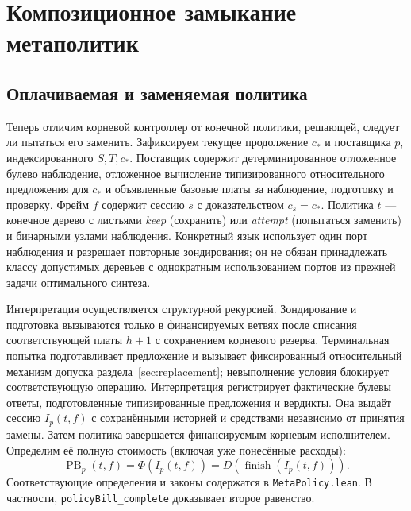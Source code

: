 \documentclass[10pt,a4paper]{article}
\newcommand{\PB}{\operatorname{PB}}
\newcommand{\finish}{\operatorname{finish}}
\newcommand{\rc}[1]{\allowbreak\texttt{#1}\allowbreak}
\begin{document}
\section{Композиционное замыкание метаполитик}\label{sec:closure}
\subsection{Оплачиваемая и заменяемая политика}
Теперь отличим корневой контроллер от конечной политики, решающей, следует ли пытаться его заменить. Зафиксируем текущее продолжение $c_*$ и поставщика $p$, индексированного $S,T,c_*$. Поставщик содержит детерминированное отложенное булево наблюдение, отложенное вычисление типизированного относительного предложения для $c_*$ и объявленные базовые платы за наблюдение, подготовку и проверку. Фрейм $f$ содержит сессию $s$ с доказательством $c_s=c_*$. Политика $t$ --- конечное дерево с листьями \emph{keep} (сохранить) или \emph{attempt} (попытаться заменить) и бинарными узлами наблюдения. Конкретный язык использует один порт наблюдения и разрешает повторные зондирования; он не обязан принадлежать классу допустимых деревьев с однократным использованием портов из прежней задачи оптимального синтеза.

Интерпретация осуществляется структурной рекурсией. Зондирование и подготовка вызываются только в финансируемых ветвях после списания соответствующей платы $h+1$ с сохранением корневого резерва. Терминальная попытка подготавливает предложение и вызывает фиксированный относительный механизм допуска раздела~\ref{sec:replacement}; невыполнение условия блокирует соответствующую операцию. Интерпретация регистрирует фактические булевы ответы, подготовленные типизированные предложения и вердикты. Она выдаёт сессию $I_p(t,f)$ с сохранёнными историей и средствами независимо от принятия замены. Затем политика завершается финансируемым корневым исполнителем. Определим её полную стоимость (включая уже понесённые расходы):
\begin{equation}\label{eq:policy-bill}
 \PB_p(t,f)=\Phi(I_p(t,f))=D(\finish(I_p(t,f))).
\end{equation}
Соответствующие определения и законы содержатся в \rc{MetaPolicy.lean}. В частности, \rc{policyBill\_complete} доказывает второе равенство.
\end{document}
